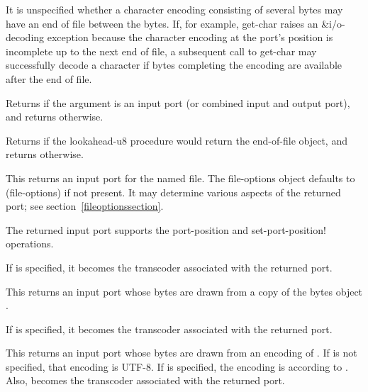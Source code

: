 It is unspecified whether a character encoding consisting of several
bytes may have an end of file between the bytes.  If, for example,
{\cf get-char} raises an {\cf\&i/o-decoding} exception because the
character encoding at the port's position is incomplete up to the next
end of file, a subsequent call to {\cf get-char} may successfully
decode a character if bytes completing the encoding are available
after the end of file.

\begin{entry}{%
}

Returns \schtrue{} if the argument is an input port (or combined input
and output port), and returns \schfalse{} otherwise.
\end{entry}

\begin{entry}{%
}
   
Returns \schtrue{} if the {\cf lookahead-u8} procedure would return
the end-of-file object, and returns \schfalse{} otherwise.
\end{entry}

\begin{entry}{%
}
   
This returns an input port for the named file. The file-options object
defaults to {\cf (file-options)} if not present. It may determine
various aspects of the returned port; see section~\ref{fileoptionssection}.

The returned input port supports the {\cf port-position} and {\cf
  set-port-position!}  operations.

If  is specified, it becomes the transcoder associated
with the returned port.
\end{entry}

\begin{entry}{%
}
   
This returns an input port whose bytes are drawn from a copy of the
bytes object .

If  is specified, it becomes the transcoder associated
with the returned port.
\end{entry}

\begin{entry}{%
}

This returns an input port whose bytes are drawn from an encoding of
.  If  is not specified, that encoding is
UTF-8.  If  is specified, the encoding is according to
.  Also,  becomes the transcoder
associated with the returned port.
\end{entry}

